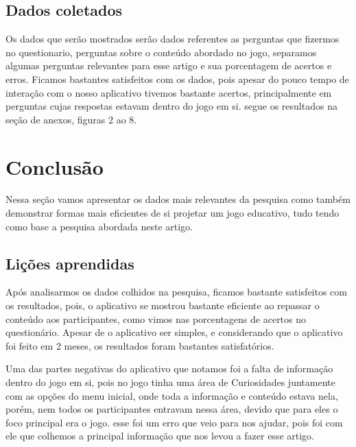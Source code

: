 \documentclass[12pt]{article}
\begin{document}
		
		
		
	\subsection{Dados coletados} %
		Os dados que serão mostrados serão dados referentes as perguntas que fizermos no questionario, perguntas sobre o conteúdo abordado no jogo, separamos algumas perguntas relevantes para esse artigo e sua porcentagem de acertos e erros. Ficamos bastantes satisfeitos com os dados, pois apesar do pouco tempo de interação com o nosso aplicativo tivemos bastante acertos, principalmente em perguntas cujas respostas estavam dentro do jogo em si. segue os resultados na seção de anexos, figuras 2 ao 8. 
	
	
	\section{Conclusão}%
		Nessa seção vamos apresentar os dados mais relevantes da pesquisa como também demonstrar formas mais eficientes de si projetar um jogo educativo, tudo tendo como base a pesquisa abordada neste artigo.
	\subsection{Lições aprendidas}
		Após analisarmos os dados colhidos na pesquisa, ficamos bastante satisfeitos com os resultados, pois, o aplicativo se mostrou bastante eficiente ao repassar o conteúdo aos participantes, como vimos nas porcentagens de acertos no questionário. Apesar de o aplicativo ser simples, e considerando que o aplicativo foi feito em 2 meses, os resultados foram bastantes satisfatórios.
		
		Uma das partes negativas do aplicativo que notamos foi a falta de informação dentro do jogo em si, pois no jogo tinha uma área de Curiosidades juntamente com as opções do menu inicial, onde toda a informação e conteúdo estava nela, porém, nem todos os participantes entravam nessa área, devido que para eles o foco principal era o jogo. esse foi um erro que veio para nos ajudar, pois foi com ele que colhemos a principal informação que nos levou a fazer esse artigo.
		
\end{document}
